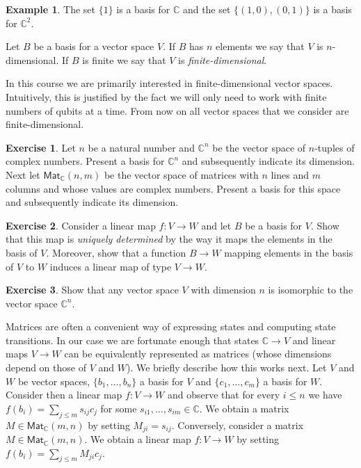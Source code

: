 \documentclass[a4paper, 11pt]{article}
\newcommand{\complex}{\mathbb{C}}
\theoremstyle{definition}
\newtheorem{examples}{Example}
\newtheorem{exercise}{Exercise}
\begin{document}
\begin{examples}
  The set $\{ 1 \}$ is a basis for $\complex$  and the set
  $\{(1,0),(0,1)\}$ is a basis for $\complex^2$.
\end{examples}

Let $B$ be a basis for a vector space $V$. If $B$ has $n$ elements we
say that $V$ is $n$-dimensional. If $B$ is finite we say that $V$ is
\emph{finite-dimensional}.

In this course we are primarily interested in finite-dimensional
vector spaces. Intuitively, this is justified by the fact we will only
need to work with finite numbers of qubits at a time. From now on all
vector spaces that we consider are finite-dimensional.


\begin{exercise}
  Let $n$ be a natural number and $\complex^n$ be the vector space of
  $n$-tuples of complex numbers. Present a basis for $\complex^n$ and
  subsequently indicate its dimension. Next let
  $\mathsf{Mat}_\complex(n,m)$ be the vector space of matrices with
  $n$ lines and $m$ columns and whose values are complex
  numbers. Present a basis for this space and subsequently indicate
  its dimension.
\end{exercise}


\begin{exercise}
  Consider a linear map $f : V \to W$ and let $B$ be a basis for
  $V$. Show that this map is \emph{uniquely determined} by the way it
  maps the elements in the basis of $V$. Moreover, show that a
  function $B \to W$ mapping elements in the basis of $V$ to $W$
  induces a linear map of type $V \to W$.
\end{exercise}


\begin{exercise}
  Show that any vector space $V$ with dimension $n$ is isomorphic to
  the vector space $\complex^n$.
\end{exercise}

Matrices are often a convenient way of expressing states and computing
state transitions. In our case we are fortunate enough that states
$\complex \to V$ and linear maps $V \to W$ can be equivalently
represented as matrices (whose dimensions depend on those of $V$ and
$W$). We briefly describe how this works next.  Let $V$ and $W$ be
vector spaces, $\{b_1,\dots,b_n\}$ a basis for $V$ and
$\{c_1,\dots,c_m\}$ a basis for $W$. Consider then a linear map
$f : V \to W$ and observe that for every $i \leq n$ we have
$f(b_i) = \sum_{j \leq m} s_{ij} c_j$ for some
$s_{i1}, \dots, s_{im} \in \complex$. We obtain a matrix
$M \in \mathsf{Mat}_\complex(m,n)$ by setting $M_{ji} = s_{ij}$.
Conversely, consider a matrix $M \in \mathsf{Mat}_\complex(m,n)$. We
obtain a linear map $f : V \to W$ by setting
$f(b_i) = \sum_{j \leq m} M_{ji} c_j$.
\end{document}
